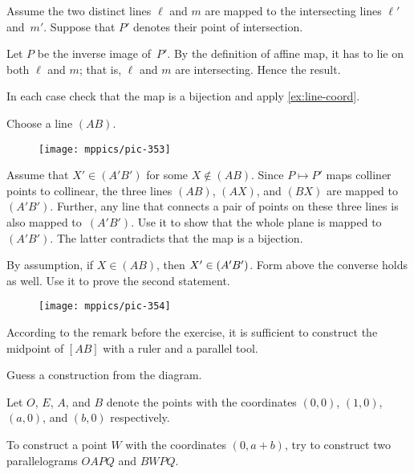 \setcounter{eqtn}{0}

Assume the two distinct lines $\ell$ and $m$ 
are mapped to the intersecting lines $\ell'$ and~$m'$.
Suppose that $P'$ denotes their point of intersection.

Let $P$ be the inverse image of~$P'$.
By the definition of affine map, it has to lie on both $\ell$ and $m$;
that is, $\ell$ and $m$ are intersecting.
Hence the result.

In each case check that the map is a bijection and apply \ref{ex:line-coord}.

Choose a line $(AB)$.

\begin{wrapfigure}{o}{20mm}
\vskip-0mm
\centering
\texttt{[image: mppics/pic-353]}
\end{wrapfigure}

Assume that $X'\in (A'B')$ for some $X\notin(AB)$.
Since $P\mapsto P'$ maps colliner points to collinear, 
the three lines $(AB)$, $(AX)$, and $(BX)$ are mapped to~$(A'B')$.
Further, any line that connects a pair of points on these three lines is also mapped to~$(A'B')$.
Use it to show that the whole plane is mapped to $(A'B')$.
The latter contradicts that the map is a bijection.

By assumption, if $X\in (AB)$, then $X'\z\in (A'B')$.
Form above the converse holds as well.
Use it to prove the second statement.

{

\begin{wrapfigure}{r}{30mm}
\vskip-0mm
\centering
\texttt{[image: mppics/pic-354]}
\end{wrapfigure}

According to the remark before the exercise,
it is sufficient to construct the midpoint of $[AB]$
with a ruler and a parallel tool.

Guess a construction from the diagram.

Let $O$, $E$, $A$, and $B$ denote the points with the coordinates $(0,0)$, $(1,0)$, $(a,0)$, and $(b,0)$ respectively.

To construct a point $W$ with the coordinates $(0,a+b)$, try to construct two parallelograms $OAPQ$ and $BWPQ$.

}

